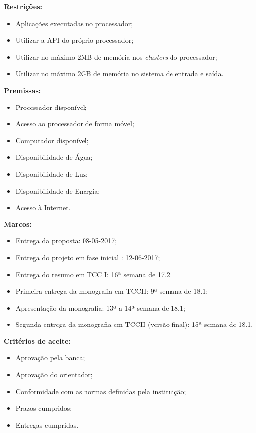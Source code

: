 \documentclass[
	12pt,				%
	openright,			%
	twoside,			%
	a4paper,			%
	english,			%
	brazil,				%
	]{abntex2}
\begin{document}
    \begin{flushleft}
    \textbf{Restrições:}
    \begin{itemize}
        \item Aplicações executadas no processador;
        \item Utilizar a API do próprio processador;
        \item Utilizar no máximo 2MB de memória nos \textit{clusters} do processador;
        \item Utilizar no máximo 2GB de memória no sistema de entrada e saída.
    \end{itemize}
    
    \textbf{Premissas:}
    \begin{itemize}
        \item Processador disponível; 
        \item Acesso ao processador de forma móvel; 
        \item Computador disponível; 
        \item Disponibilidade de Água; 
        \item Disponibilidade de Luz; 
        \item Disponibilidade de Energia; 
        \item Acesso à Internet.
    \end{itemize}
    
    \textbf{Marcos:}
    \begin{itemize}
        \item Entrega da proposta: 08-05-2017; 
        \item Entrega do projeto em fase inicial : 12-06-2017; 
        \item Entrega do resumo em TCC I: 16ª semana de 17.2; 
        \item Primeira entrega da monografia em TCCII: 9ª semana de 18.1; 
        \item Apresentação da monografia: 13ª a 14ª semana de 18.1;
        \item Segunda entrega da monografia em TCCII (versão final): 15ª semana de 18.1.
    \end{itemize}
    
    \textbf{Critérios de aceite:}
    \begin{itemize}
        \item Aprovação pela banca;
        \item Aprovação do orientador;
        \item Conformidade com as normas definidas pela instituição;
        \item Prazos cumpridos;
        \item Entregas cumpridas.
    \end{itemize}
    \end{flushleft}
\end{document}
